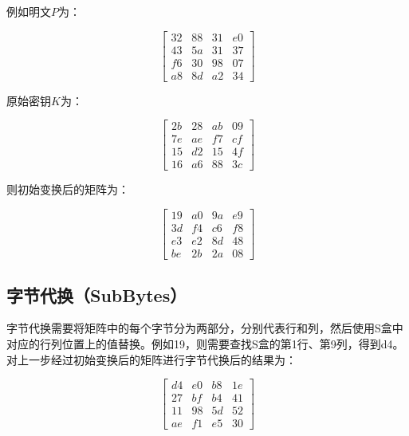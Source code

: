 \vspace{0.5cm}

例如明文$ P $为：

$$
    \begin{bmatrix}
        32 & 88 & 31 & e0 \\
        43 & 5a & 31 & 37 \\
        f6 & 30 & 98 & 07 \\
        a8 & 8d & a2 & 34
    \end{bmatrix}
$$

\vspace{0.5cm}

原始密钥$ K $为：

$$
    \begin{bmatrix}
        2b & 28 & ab & 09 \\
        7e & ae & f7 & cf \\
        15 & d2 & 15 & 4f \\
        16 & a6 & 88 & 3c
    \end{bmatrix}
$$

\vspace{0.5cm}

则初始变换后的矩阵为：

$$
    \begin{bmatrix}
        19 & a0 & 9a & e9 \\
        3d & f4 & c6 & f8 \\
        e3 & e2 & 8d & 48 \\
        be & 2b & 2a & 08
    \end{bmatrix}
$$

\vspace{0.5cm}

\subsection{字节代换（SubBytes）}

字节代换需要将矩阵中的每个字节分为两部分，分别代表行和列，然后使用S盒中对应的行列位置上的值替换。例如19，则需要查找S盒的第1行、第9列，得到d4。\\

对上一步经过初始变换后的矩阵进行字节代换后的结果为：

$$
    \begin{bmatrix}
        d4 & e0 & b8 & 1e \\
        27 & bf & b4 & 41 \\
        11 & 98 & 5d & 52 \\
        ae & f1 & e5 & 30
    \end{bmatrix}
$$

